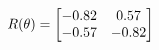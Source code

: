 \documentclass[preview]{standalone}
\begin{document}
\begin{align*}
\special{dvisvgm:raw <g id='unique000'>}R(\theta) = \begin{bmatrix}-0.82 & 0.57\\-0.57 & -0.82\end{bmatrix}\special{dvisvgm:raw </g>}
\end{align*}
\end{document}
